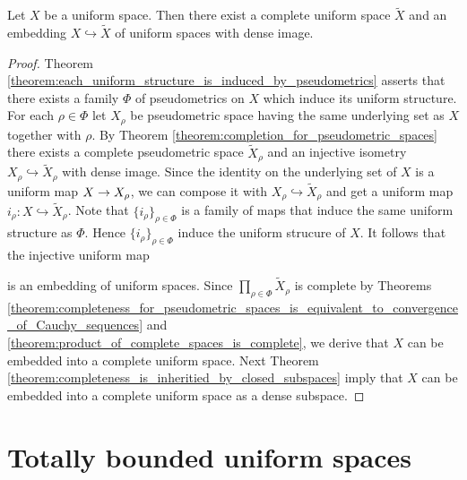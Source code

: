 \begin{theorem}\label{theorem:completion_for_uniform_spaces}
	Let $X$ be a uniform space. Then there exist a complete uniform space $\tilde{X}$ and an embedding $X \hookrightarrow \tilde{X}$ of uniform spaces with dense image.
\end{theorem}
\begin{proof}
	Theorem \ref{theorem:each_uniform_structure_is_induced_by_pseudometrics} asserts that there exists a family $\Phi$ of pseudometrics on $X$ which induce its uniform structure. For each $\rho \in \Phi$ let $X_{\rho}$ be pseudometric space having the same underlying set as $X$ together with $\rho$. By Theorem \ref{theorem:completion_for_pseudometric_spaces} there exists a complete pseudometric space $\tilde{X}_{\rho}$ and an injective isometry $X_{\rho} \hookrightarrow \tilde{X}_{\rho}$ with dense image. Since the identity on the underlying set of $X$ is a uniform map $X \rightarrow X_{\rho}$, we can compose it with $X_{\rho} \hookrightarrow \tilde{X}_{\rho}$ and get a uniform map $i_{\rho}:X \hookrightarrow \tilde{X}_{\rho}$. Note that $\{i_{\rho}\}_{\rho\in \Phi}$ is a family of maps that induce the same uniform structure as $\Phi$. Hence $\{i_{\rho}\}_{\rho \in \Phi}$ induce the uniform strucure of $X$. It follows that the injective uniform map
	\begin{center}
	\end{center}
	is an embedding of uniform spaces. Since $\prod_{\rho \in \Phi}\tilde{X}_{\rho}$ is complete by Theorems \ref{theorem:completeness_for_pseudometric_spaces_is_equivalent_to_convergence_of_Cauchy_sequences} and \ref{theorem:product_of_complete_spaces_is_complete}, we derive that $X$ can be embedded into a complete uniform space. Next Theorem \ref{theorem:completeness_is_inheritied_by_closed_subspaces} imply that $X$ can be embedded into a complete uniform space as a dense subspace.
\end{proof}

\section{Totally bounded uniform spaces}

